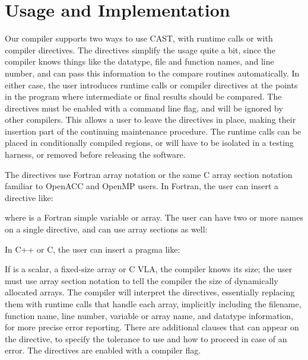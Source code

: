 \section{Usage and Implementation}

Our compiler supports two ways to use CAST, with runtime calls or with compiler directives.
The directives simplify the usage quite a bit, since the compiler knows things like the datatype, file and function names, and line number, and can pass this information to the compare routines automatically.
In either case, the user introduces runtime calls or compiler directives at the points in the program where intermediate or final results should be compared.
The directives must be enabled with a command line flag, and will be ignored by other compilers.
This allows a user to leave the directives in place, making their insertion part of the continuing maintenance procedure.
The runtime calls can be placed in conditionally compiled regions, or will have to be isolated in a testing harness, or removed before releasing the software.

The directives use Fortran array notation or the same C array section notation familiar to OpenACC and OpenMP users.
In Fortran, the user can insert a directive like:
\begin{otabbing}
\>
\end{otabbing}
where  is a Fortran simple variable or array.
The user can have two or more names on a single directive, and can use array sections as well:
\begin{otabbing}
\>
\end{otabbing}
In C++ or C, the user can insert a pragma like:
\begin{otabbing}
\>
\end{otabbing}
If  is a scalar, a fixed-size array or C VLA, the compiler knows its size; the user must use array section notation to tell the compiler the size of dynamically allocated arrays.
The compiler will interpret the directives, essentially replacing them with runtime calls that handle each array, implicitly including the filename, function name, line number, variable or array name, and datatype information, for more precise error reporting.
There are additional clauses that can appear on the directive, to specify the tolerance to use and how to proceed in case of an error.
The directives are enabled with a compiler flag.

